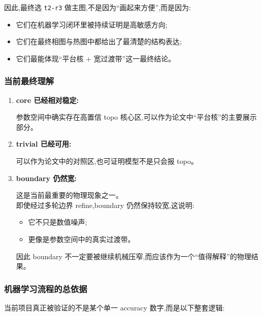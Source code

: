 \documentclass[lang=cn,scheme=chinese,color=blue,device=normal,toc=onecol,math=cm]{elegantbook}
\begin{document}
\begin{enumerate}
因此,最终选 \texttt{t2-r3} 做主图,不是因为“画起来方便”,而是因为:\par
 
\begin{itemize}
\item 它们在机器学习闭环里被持续证明是高敏感方向;
\item 它们在最终相图与热图中都给出了最清楚的结构表达;
\item 它们最能体现“平台核 + 宽过渡带”这一最终结论。
\end{itemize}
\end{enumerate}


\subsubsection{当前最终理解}


\begin{enumerate}
\item \textbf{core 已经相对稳定:}\par
 
参数空间中确实存在高置信 topo 核心区,可以作为论文中“平台核”的主要展示部分。\par
\item \textbf{trivial 已经可用:}\par
 
可以作为论文中的对照区,也可证明模型不是只会报 topo。\par
\item \textbf{boundary 仍然宽:}\par
 
这是当前最重要的物理现象之一。\\ 即使经过多轮边界 refine,boundary 仍然保持较宽,这说明:\par
 
\begin{itemize}
\item 它不只是数值噪声;
\item 更像是参数空间中的真实过渡带。
\end{itemize}
 
因此 boundary 不一定要被继续机械压窄,而应该作为一个“值得解释”的物理结果。\par
\end{enumerate}


\subsubsection{机器学习流程的总依据}


当前项目真正被验证的不是某个单一 accuracy 数字,而是以下整套逻辑:\par
\end{document}
